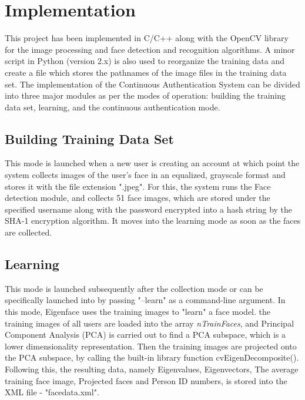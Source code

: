 \documentclass[12pt]{article}			%
\begin{document}
\newpage

\section{ Implementation }  
This project has been implemented in C/C++ along with the OpenCV library for the image processing and face detection and recognition algorithms. A minor script in Python (version 2.x) is also used to reorganize the training data and create a file which stores the pathnames of the image files in the training data set. The implementation of the Continuous Authentication System can be divided into three major modules as per the modes of operation: building the training data set, learning, and the continuous authentication mode.

\subsection { Building Training Data Set }
This mode is launched when a new user is creating an account at which point the system collects images of the user's face in an equalized, grayscale format and stores it with the file extension ".jpeg". For this, the system runs the Face detection module, and collects 51 face images, which are stored under the specified username along with the password encrypted into a hash string by the SHA-1 encryption algorithm. It moves into the learning mode as soon as the faces are collected. 
\subsection { Learning }
This mode is launched subsequently after the collection mode or can be specifically launched into by passing "--learn" as a command-line argument. In this mode, Eigenface uses the training images to "learn" a face model. the training images of all users are loaded into the array \emph {nTrainFaces}, and Principal Component Analysis (PCA) is carried out to find a PCA subspace, which is a lower dimensionality representation. Then the training images are projected onto the PCA subspace, by calling the built-in library function cvEigenDecomposite(). Following this, the resulting data, namely Eigenvalues, Eigenvectors, The average training face image, Projected faces and Person ID numbers, is stored into the XML file - "facedata.xml".
\end{document}
